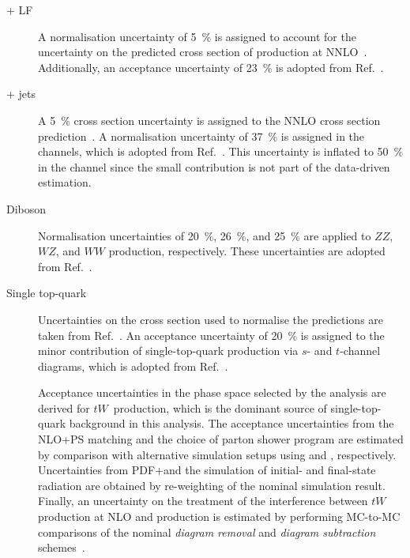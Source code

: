 \begin{description}

\item[\PZ + LF] A normalisation uncertainty of \SI{5}{\percent} is assigned to
  account for the uncertainty on the predicted cross section of \Zjets
  production at NNLO~\cite{Anastasiou:2003ds}. Additionally, an acceptance
  uncertainty of \SI{23}{\percent} is adopted from Ref.~\cite{HIGG-2018-51}.

\item[\PW + jets] A \SI{5}{\percent} cross section uncertainty is assigned to
  the NNLO cross section prediction~\cite{Anastasiou:2003ds}. A normalisation
  uncertainty of \SI{37}{\percent} is assigned in the \lephad channels, which is
  adopted from Ref.~\cite{HIGG-2018-51}. This uncertainty is inflated to
  \SI{50}{\percent} in the \hadhad channel since the small \Wjets contribution
  is not part of the data-driven \faketauhadvis estimation.

\item[Diboson] Normalisation uncertainties of \SI{20}{\percent},
  \SI{26}{\percent}, and \SI{25}{\percent} are applied to $ZZ$, $WZ$, and $WW$
  production, respectively. These uncertainties are adopted from
  Ref.~\cite{HIGG-2018-51}.

\item[Single top-quark] Uncertainties on the cross section used to normalise the
  predictions are taken from Ref.~\cite{stopxsec}. An acceptance uncertainty of
  \SI{20}{\percent} is assigned to the minor contribution of single-top-quark
  production via $s$- and $t$-channel diagrams, which is adopted from
  Ref.~\cite{HIGG-2018-51}.

  Acceptance uncertainties in the phase space selected by the analysis are
  derived for $tW$~production, which is the dominant source of single-top-quark
  background in this analysis. The acceptance uncertainties from the NLO+PS
  matching and the choice of parton shower program are estimated by comparison
  with alternative simulation setups using \MGNLO and \HERWIG[7],
  respectively. Uncertainties from PDF+\alphas and the simulation of initial-
  and final-state radiation are obtained by re-weighting of the nominal
  simulation result. Finally, an uncertainty on the treatment of the
  interference between $tW$ production at NLO and \ttbar production is estimated
  by performing MC-to-MC comparisons of the nominal \emph{diagram removal} and
  \emph{diagram subtraction} schemes~\cite{Frixione:2008yi}.


\end{description}
